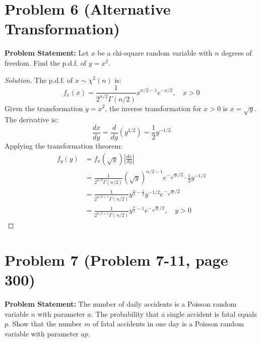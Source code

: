 \documentclass{article}
\begin{document}
\vspace{1cm}

\section*{Problem 6 (Alternative Transformation)}
\textbf{Problem Statement:}
Let $x$ be a chi-square random variable with $n$ degrees of freedom. Find the p.d.f. of $y = x^2$.

\begin{proof}[Solution]
	The p.d.f. of $x \sim \chi^2(n)$ is:
	\[
		f_x(x) = \frac{1}{2^{n/2}\Gamma(n/2)} x^{n/2-1} e^{-x/2}, \quad x > 0
	\]
	Given the transformation $y = x^2$, the inverse transformation for $x > 0$ is $x = \sqrt{y}$.
	The derivative is:
	\[
		\frac{dx}{dy} = \frac{d}{dy}(y^{1/2}) = \frac{1}{2}y^{-1/2}
	\]
	Applying the transformation theorem:
	\begin{align*}
		f_y(y) &= f_x(\sqrt{y}) \left| \frac{dx}{dy} \right| \\
		&= \frac{1}{2^{n/2}\Gamma(n/2)} (\sqrt{y})^{n/2-1} e^{-\sqrt{y}/2} \cdot \frac{1}{2}y^{-1/2} \\
		&= \frac{1}{2^{n/2+1}\Gamma(n/2)} y^{\frac{n}{4}-\frac{1}{2}} y^{-1/2} e^{-\sqrt{y}/2} \\
		&= \frac{1}{2^{n/2+1}\Gamma(n/2)} y^{\frac{n}{4}-1} e^{-\sqrt{y}/2}, \quad y > 0
	\end{align*}
\end{proof}

\vspace{1cm}

\section*{Problem 7 (Problem 7-11, page 300)}
\textbf{Problem Statement:}
The number of daily accidents is a Poisson random variable $n$ with parameter $a$. The probability that a single accident is fatal equals $p$. Show that the number $m$ of fatal accidents in one day is a Poisson random variable with parameter $ap$.
\end{document}
